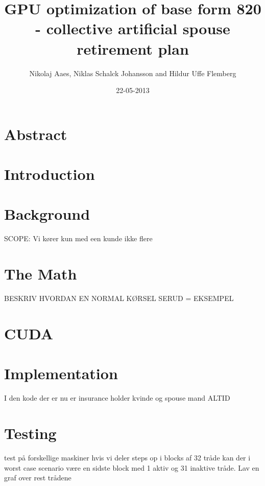 \documentclass[12pt]{article}
\title{GPU optimization of base form 820 - collective artificial spouse retirement plan}
\author{Nikolaj Aaes, Niklas Schalck Johansson and Hildur Uffe Flemberg}
\date{22-05-2013}
\begin{document}
	\maketitle
	
	
	\section{Abstract}
	
	
	
	\section{Introduction}
	
	
		
	\section{Background}
	SCOPE: Vi kører kun med een kunde ikke flere
		
	
		
	\section{The Math}
		
	
	
	BESKRIV HVORDAN EN NORMAL KØRSEL SERUD = EKSEMPEL
		
	\section{CUDA}

	
		
	\section{Implementation}
		
	
	I den kode der er nu er insurance holder kvinde og spouse mand ALTID
		
	\section{Testing}
	test på forskellige maskiner
	hvis vi deler steps op i blocks af 32 tråde kan der i worst case scenario være en sidste block med 1 aktiv og 31 inaktive tråde.
	Lav en graf over rest trådene
		
\end{document}
